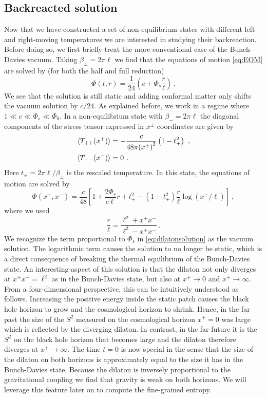 \documentclass[a4paper,11pt]{article}
\newcommand{\beq}{\begin{equation}}
\newcommand{\eeq}{\end{equation}}
\newcommand{\bal}{\begin{aligned}}
\newcommand{\eal}{\end{aligned}}
\numberwithin{equation}{section}
\begin{document}
\subsection{Backreacted solution}
%
Now that we have constructed a set of non-equilibrium states with different left and right-moving temperatures we are interested in studying their backreaction. Before doing so, we first briefly treat the more conventional case of the Bunch-Davies vacuum. Taking $\beta_\pm = 2\pi\ell$ we find that the equations of motion \eqref{eq:EOM} are solved by (for both the half and full reduction)
\beq
\Phi(t,r) = \frac1{24}\left(c+\Phi_s\frac{r}{\ell} \right)~.
\eeq
We see that the solution is still static and adding conformal matter only shifts the vacuum solution by $c/24$. As explained before, we work in a regime where $1\ll c \ll \Phi_s\ll \Phi_0 $. In a non-equilibrium state with $\beta_-=2\pi\ell$ the diagonal components of the stress tensor expressed in $x^\pm$ coordinates are given by
\beq \label{eq:UnruhStress}
\bal
\braket{T_{++}(x^+)} &= -\frac{c}{48\pi {(x^+)}^2}\left(1-t_+^2\right) ~, \\
\braket{T_{--}(x^-)} &= 0 ~. \\
\eal
\eeq
Here $t_\pm=2\pi\ell/\beta_\pm$ is the rescaled temperature. In this state, the equations of motion are solved by
\beq \label{eq:dilatonsolution}
\Phi(x^+,x^-) = \frac{c}{48}\left[1+\frac{2\Phi_s}{c\ell}r + t_+^2 -\left(1-t_+^2\right) \frac{r}{\ell}\log(x^+/\ell)\right] ~,
\eeq
where we used
\beq
\frac r{\ell} = \frac{\ell^2+x^+x^-}{\ell^2-x^+x^-} ~.
\eeq
We recognize the term proportional to $\Phi_s$ in \eqref{eq:dilatonsolution} as the vacuum solution. The logarithmic term causes the solution to no longer be static, which is a direct consequence of breaking the thermal equilibrium of the Bunch-Davies state. An interesting aspect of this solution is that the dilaton not only diverges at $x^+x^-=\ell^2$ as in the Bunch-Davies state, but also at $x^+\to0$ and $x^+\to\infty$. From a four-dimensional perspective, this can be intuitively understood as follows. Increasing the positive energy inside the static patch causes the black hole horizon to grow and the cosmological horizon to shrink. Hence, in the far past the size of the $S^2$ measured on the cosmological horizon $x^+=0$ was large which is reflected by the diverging dilaton. In contrast, in the far future it is the $S^2$ on the black hole horizon that becomes large and the dilaton therefore diverges at $x^+\to\infty$. The time $t=0$ is now special in the sense that the size of the dilaton on both horizons is approximately equal to the size it has in the Bunch-Davies state. Because the dilaton is inversely proportional to the gravitational coupling we find that gravity is weak on both horizons. We will leverage this feature later on to compute the fine-grained entropy.
\end{document}
